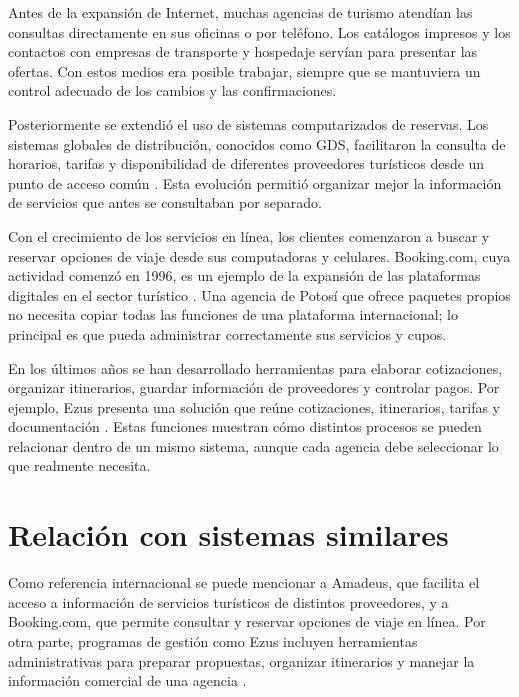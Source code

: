 \label{cap:antecedentes}

Antes de la expansión de Internet, muchas agencias de turismo atendían las
consultas directamente en sus oficinas o por teléfono. Los catálogos
impresos y los contactos con empresas de transporte y hospedaje servían para
presentar las ofertas. Con estos medios era posible trabajar, siempre que se
mantuviera un control adecuado de los cambios y las confirmaciones.

Posteriormente se extendió el uso de sistemas computarizados de reservas. Los
sistemas globales de distribución, conocidos como GDS, facilitaron la
consulta de horarios, tarifas y disponibilidad de diferentes proveedores
turísticos desde un punto de acceso común \parencite{amadeusGDS}. Esta
evolución permitió organizar mejor la información de servicios que antes se
consultaban por separado.

Con el crecimiento de los servicios en línea, los clientes comenzaron a
buscar y reservar opciones de viaje desde sus computadoras y celulares.
Booking.com, cuya actividad comenzó en 1996, es un ejemplo de la expansión de
las plataformas digitales en el sector turístico \parencite{booking}. Una
agencia de Potosí que ofrece paquetes propios no necesita copiar todas las
funciones de una plataforma internacional; lo principal es que pueda
administrar correctamente sus servicios y cupos.

En los últimos años se han desarrollado herramientas para elaborar
cotizaciones, organizar itinerarios, guardar información de proveedores y
controlar pagos. Por ejemplo, Ezus presenta una solución que reúne
cotizaciones, itinerarios, tarifas y documentación \parencite{ezus}. Estas
funciones muestran cómo distintos procesos se pueden relacionar dentro de un
mismo sistema, aunque cada agencia debe seleccionar lo que realmente
necesita.

\section*{Relación con sistemas similares}

Como referencia internacional se puede mencionar a Amadeus, que facilita el
acceso a información de servicios turísticos de distintos proveedores, y a
Booking.com, que permite consultar y reservar opciones de viaje en línea. Por
otra parte, programas de gestión como Ezus incluyen herramientas
administrativas para preparar propuestas, organizar itinerarios y manejar la
información comercial de una agencia \parencite{amadeusGDS,booking,ezus}.

